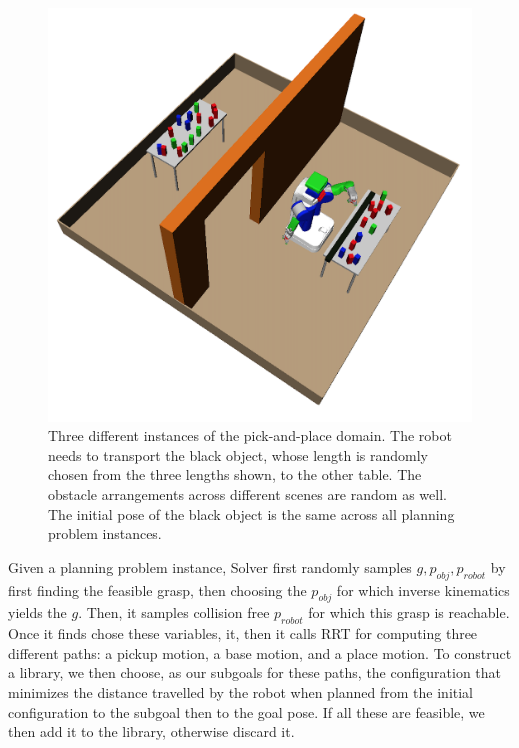 \begin{figure}[htb]
\includegraphics[scale=0.18]{./figures/biggest3}
\caption{Three different instances of the pick-and-place domain.
The robot needs to transport the black object, whose length is
randomly chosen from the three lengths shown, to the other table. The obstacle arrangements
across different scenes are random as well. The initial pose of
the black object is the same across all planning problem instances.}
\label{fig:biggest_domain}
\end{figure}


Given a planning problem instance, Solver first randomly
samples $g,p_{obj},p_{robot}$ by first finding the
feasible grasp, then choosing the $p_{obj}$ for which
inverse kinematics yields the $g$. Then, it samples
collision free $p_{robot}$ for which this grasp is
reachable. Once it finds chose these variables,
it, then it calls RRT
for computing three different paths: a pickup motion,
a base motion, and a place motion. To construct
a library, we then choose, as our subgoals for these paths, the 
configuration that minimizes the distance
travelled by the robot when planned from the initial
configuration to the subgoal then to the goal pose. If all
these are feasible, we then add it to the library,
otherwise discard it.

